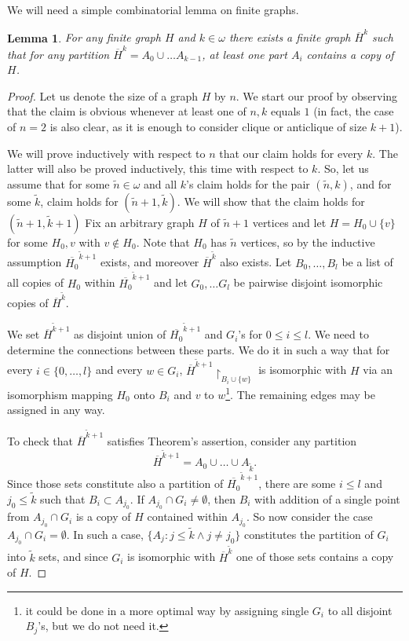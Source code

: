 \documentclass{amsart}
\newtheorem{lemma}[theorem]{Lemma}
\theoremstyle{plain}
\theoremstyle{definition}
\theoremstyle{remark}
\numberwithin{equation}{section}
\newcommand{\black}{\color{black}}
\begin{document}
We will need a simple combinatorial lemma on finite graphs.

\begin{lemma}\label{partitionlemma}
    For any finite graph $H$ and $k\in \omega$ there exists a finite graph $\overline{H}^k$ such that for any partition $\overline{H}^k=A_0\cup \ldots A_{k-1}$, at least one part \(A_{i}\) contains a copy of \(H\).
\end{lemma}

\begin{proof}
 Let us denote the size of a graph $H$ by $n$. We start our proof by observing that the claim is obvious whenever at least one of $n,k$ equals $1$ (in fact, the case of $n=2$ is also clear, as it is enough to consider clique or anticlique of size $k+1$). 

We will prove inductively with respect to $n$ that our claim holds for every $k$. The latter will also  be proved inductively, this time with respect to $k$. So, let us assume that for some $\tilde{n}\in \omega$ and all $k$'s claim holds for the pair $(\tilde{n},k)$, and for some $\tilde{k}$, claim holds for $(\tilde{n}+1,\tilde{k})$. We will show that the claim holds for $(\tilde{n}+1, \tilde{k}+1)$ Fix an arbitrary graph $H$ of $\tilde{n}+1$ vertices and let $H=H_0\cup\{v\}$ for some $H_0,v$ with $v\notin H_0$. Note that $H_0$ has $\tilde{n}$ vertices, so by the inductive assumption $\overline{H_0}^{\tilde{k}+1}$ exists, and moreover $\overline{H}^{\tilde{k}}$ also exists. Let $B_0, \ldots, B_l$ be a list of all copies of $H_0$ within $\overline{H_0}^{\tilde{k}+1}$ and let $G_0, \ldots G_l$ be pairwise disjoint isomorphic copies of $\overline{H}^{\tilde{k}}$.

We set $\overline{H}^{\tilde{k}+1}$ as disjoint union of $\overline{H_0}^{\tilde{k}+1}$ and $G_i$'s for $0\leq i \leq l$. We need to determine the connections between these parts. We do it in such a way that for every $i\in \{0,\ldots, l\}$ and every $w\in G_i$, $\overline{H}^{\tilde{k}+1}\upharpoonright_{B_i\cup\{w\}}$ is isomorphic with $H$ via an isomorphism mapping $H_0$ onto $B_i$ and $v$ to $w$\footnote{it could be done in a more optimal way by assigning single $G_i$ to all disjoint $B_j$'s, but we do not need it.}. The remaining edges may be assigned in any way.

To check that $\overline{H}^{\tilde{k}+1}$ satisfies Theorem's assertion, consider any partition 
\[\overline{H}^{\tilde{k}+1}=A_0\cup \ldots\cup A_{\tilde{k}}.
\]
 Since those sets constitute also a partition of $\overline{H_0}^{\tilde{k}+1}$, there are some $i\leq l$ and $j_0\leq \tilde{k}$ such that $B_i\subset A_{j_0} $. If $A_{j_0}\cap G_i\neq \emptyset$, then $B_i$ with addition of a single point from $A_{j_0}\cap G_i$ is a copy of $H$ contained within $A_{j_0}$. So now consider the case $A_{j_0}\cap G_i=\emptyset$. In such a case, $\{A_j\colon j\leq \tilde{k} \wedge j\neq j_0\}$ constitutes the partition of $G_i$ into $\tilde{k}$ sets, and since $G_i$ is isomorphic with $\overline{H}^{\tilde{k}}$ one of those sets contains a copy of $H$.\black
\end{proof}
\end{document}
